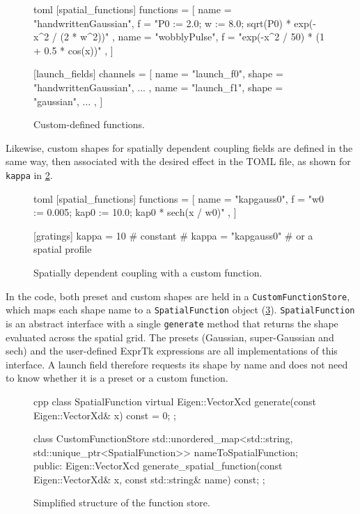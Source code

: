 \begin{figure}
\begin{code}{toml}
[spatial_functions]
functions = [
  { name = "handwrittenGaussian", f = "P0 := 2.0; w := 8.0; sqrt(P0) * exp(-x^2 / (2 * w^2))" },
  { name = "wobblyPulse", f = "exp(-x^2 / 50) * (1 + 0.5 * cos(x))" },
]

[launch_fields]
channels = [
  { name = "launch_f0", shape = "handwrittenGaussian", ... },
  { name = "launch_f1", shape = "gaussian", ... },
]
\end{code}
  \caption{Custom-defined functions.}
  \label{fig:custom-functions}
\end{figure}

Likewise, custom shapes for spatially dependent coupling fields are defined in the same way, then associated with the 
desired effect in the TOML file, as shown for \texttt{kappa} in \cref{fig:spatial-coupling}.

\begin{figure}
\begin{code}{toml}
[spatial_functions]
functions = [
  { name = "kapgauss0", f = "w0 := 0.005; kap0 := 10.0; kap0 * sech(x / w0)" },
]

[gratings]
kappa = 10 # constant
# kappa = "kapgauss0" # or a spatial profile
\end{code}
  \caption{Spatially dependent coupling with a custom function.}
  \label{fig:spatial-coupling}
\end{figure}

In the code, both preset and custom shapes are held in a \texttt{CustomFunctionStore}, which maps each shape name 
to a \texttt{SpatialFunction} object (\cref{fig:function-store}). \texttt{SpatialFunction} is an abstract interface 
with a single \texttt{generate} method that returns the shape evaluated across the spatial grid. 
The presets (Gaussian, super-Gaussian and sech) and the user-defined ExprTk expressions are all 
implementations of this interface. A launch field therefore requests its shape by name and does not need to know 
whether it is a preset or a custom function.

\begin{figure}
\begin{code}{cpp}
class SpatialFunction {
    virtual Eigen::VectorXcd generate(const Eigen::VectorXd& x) const = 0;
};

class CustomFunctionStore {
    std::unordered_map<std::string, std::unique_ptr<SpatialFunction>> nameToSpatialFunction;
public:
    Eigen::VectorXcd generate_spatial_function(const Eigen::VectorXd& x,
                                               const std::string& name) const;
};
\end{code}
  \caption{Simplified structure of the function store.}
  \label{fig:function-store}
\end{figure}

